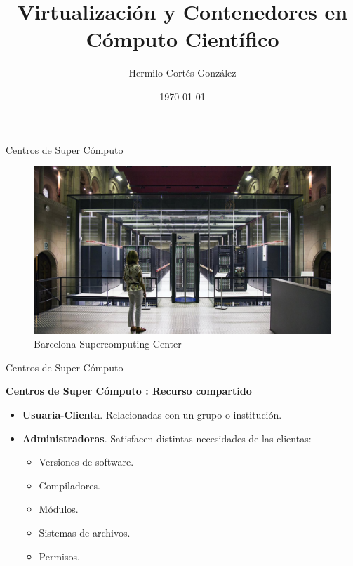 \documentclass[11pt]{beamer}
\title[]{Virtualización y Contenedores en Cómputo Científico}
\institute[EGTP]{Escuela de Gobierno y Transformación Pública\\Data Pub}
\date{\today}
\author{Hermilo Cortés González}
\begin{document}
\begin{frame}
\titlepage
\end{frame}


\begin{frame}{Centros de Super Cómputo}
	\begin{figure}
		\includegraphics[scale=0.2]{images/barcelona_supercomputing.jpg}
		\caption{Barcelona Supercomputing Center}
	\end{figure}
\end{frame}

\begin{frame}{Centros de Super Cómputo}
	\begin{center}
		\textbf{Centros de Super Cómputo : Recurso compartido}
	\end{center}
	
	\begin{itemize}
		\item  \textbf{Usuaria-Clienta}. Relacionadas con un grupo o institución.
		\item \textbf{Administradoras}. Satisfacen distintas necesidades de las clientas:
			\begin{itemize}
				\item Versiones de software.
				\item Compiladores.
				\item Módulos.
				\item Sistemas de archivos.
				\item Permisos.
			\end{itemize}
		
	\end{itemize}

\end{frame}
\end{document}
